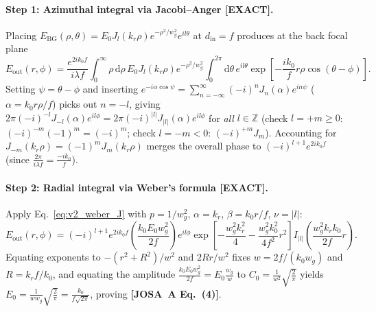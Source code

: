 \documentclass[10pt,letterpaper]{article}
\newcommand{\abs}[1]{\lvert #1 \rvert}
\newcommand{\dd}{\mathrm{d}}
\newcommand{\josa}[1]{\textbf{[JOSA~A Eq.~(#1)]}}
\newcommand{\tagexact}{\textcolor{forest}{\textbf{[EXACT]}}}
\numberwithin{equation}{section}
\begin{document}
\paragraph*{Step 1: Azimuthal integral via Jacobi--Anger \tagexact{}.}
Placing $E_{\mathrm{BG}}(\rho,\theta) = E_0 J_l(k_r\rho)e^{-\rho^2/w_g^2}e^{il\theta}$ at $d_{\mathrm{in}} = f$ produces at the back focal plane
\begin{equation}
  E_{\mathrm{out}}(r,\phi) = \frac{e^{2ik_0 f}}{i\lambda f}\int_0^\infty \rho\,\dd\rho\,E_0 J_l(k_r\rho)e^{-\rho^2/w_g^2}\int_0^{2\pi}\dd\theta\,e^{il\theta}\exp\!\left[-\frac{ik_0}{f}r\rho\cos(\theta-\phi)\right].
\end{equation}
Setting $\psi = \theta - \phi$ and inserting $e^{-i\alpha\cos\psi} = \sum_{n=-\infty}^\infty (-i)^n J_n(\alpha) e^{in\psi}$ ($\alpha = k_0 r\rho/f$) picks out $n = -l$, giving $2\pi(-i)^{-l} J_{-l}(\alpha) e^{il\phi} = 2\pi(-i)^{\abs{l}} J_{\abs{l}}(\alpha) e^{il\phi}$ for \emph{all} $l \in \mathbb{Z}$ (check $l = +m \ge 0$: $(-i)^{-m}(-1)^m = (-i)^m$; check $l = -m < 0$: $(-i)^{+m} J_m$). Accounting for $J_{-m}(k_r\rho) = (-1)^m J_m(k_r\rho)$ merges the overall phase to $(-i)^{l+1} e^{2ik_0 f}$ (since $\frac{2\pi}{i\lambda f} = \frac{-i k_0}{f}$).

\paragraph*{Step 2: Radial integral via Weber's formula \tagexact{}.}
Apply Eq.~\eqref{eq:v2_weber_J} with $p = 1/w_g^2$, $\alpha = k_r$, $\beta = k_0 r/f$, $\nu = \abs{l}$:
\begin{equation}
  E_{\mathrm{out}}(r,\phi) = (-i)^{l+1} e^{2ik_0 f}\left(\frac{k_0 E_0 w_g^2}{2f}\right) e^{il\phi}\exp\!\left[-\frac{w_g^2 k_r^2}{4} - \frac{w_g^2 k_0^2}{4f^2}r^2\right] I_{\abs{l}}\!\left(\frac{w_g^2 k_r k_0}{2f}r\right).
\end{equation}
Equating exponents to $-(r^2+R^2)/w^2$ and $2Rr/w^2$ fixes $w = 2f/(k_0 w_g)$ and $R = k_r f/k_0$, and equating the amplitude $\frac{k_0 E_0 w_g^2}{2f} = E_0 \frac{w_g}{w}$ to $C_0 = \frac{1}{w^2}\sqrt{\frac{2}{\pi}}$ yields $E_0 = \frac{1}{w w_g}\sqrt{\frac{2}{\pi}} = \frac{k_0}{f\sqrt{2\pi}}$, proving \josa{4}.
\end{document}
